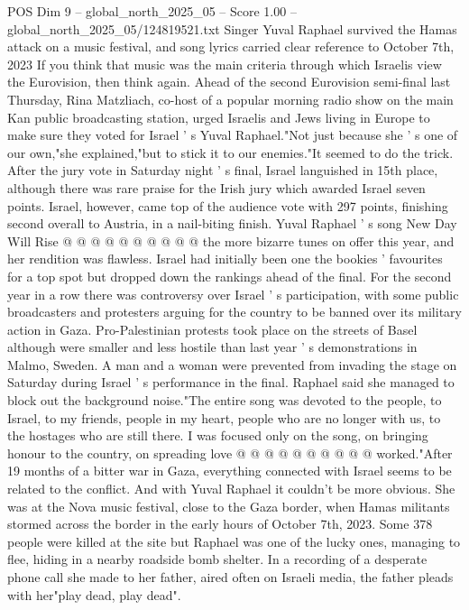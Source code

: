\begin{textsample}{POS Dim 9 – global\_north\_2025\_05 – Score 1.00 – global\_north\_2025\_05/124819521.txt}  \label{ex:f9_pos_370}
Singer Yuval Raphael survived the Hamas attack on a music festival, and song lyrics carried clear reference to October 7th, 2023 If you think that music was the main criteria through which Israelis view the Eurovision, then think again.
Ahead of the second Eurovision semi-final last Thursday, Rina Matzliach, co-host of a popular morning radio show on the main Kan public broadcasting station, urged Israelis and Jews living in Europe to make sure they voted for Israel ' s Yuval Raphael."Not just because she ' s one of our own,"she explained,"but to stick it to our enemies."It seemed to do the trick.
After the jury vote in Saturday night ' s final, Israel languished in 15th place, although there was rare praise for the Irish jury which awarded Israel seven points.
Israel, however, came top of the audience vote with 297 points, finishing second overall to Austria, in a nail-biting finish.
Yuval Raphael ' s song New Day Will Rise @ @ @ @ @ @ @ @ @ @ the more bizarre tunes on offer this year, and her rendition was flawless.
Israel had initially been one the bookies ' favourites for a top spot but dropped down the rankings ahead of the final.
For the second year in a row there was controversy over Israel ' s participation, with some public broadcasters and protesters arguing for the country to be banned over its military action in Gaza.
Pro-Palestinian protests took place on the streets of Basel although were smaller and less hostile than last year ' s demonstrations in Malmo, Sweden.
A man and a woman were prevented from invading the stage on Saturday during Israel ' s performance in the final.
Raphael said she managed to block out the background noise."The entire song was devoted to the people, to Israel, to my friends, people in my heart, people who are no longer with us, to the hostages who are still there.
I was focused only on the song, on bringing honour to the country, on spreading love @ @ @ @ @ @ @ @ @ @ worked."After 19 months of a bitter war in Gaza, everything connected with Israel seems to be related to the conflict.
And with Yuval Raphael it couldn't be more obvious.
She was at the Nova music festival, close to the Gaza border, when Hamas militants stormed across the border in the early hours of October 7th, 2023.
Some 378 people were killed at the site but Raphael was one of the lucky ones, managing to flee, hiding in a nearby roadside bomb shelter.
In a recording of a desperate phone call she made to her father, aired often on Israeli media, the father pleads with her"play dead, play dead".

\end{textsample}
